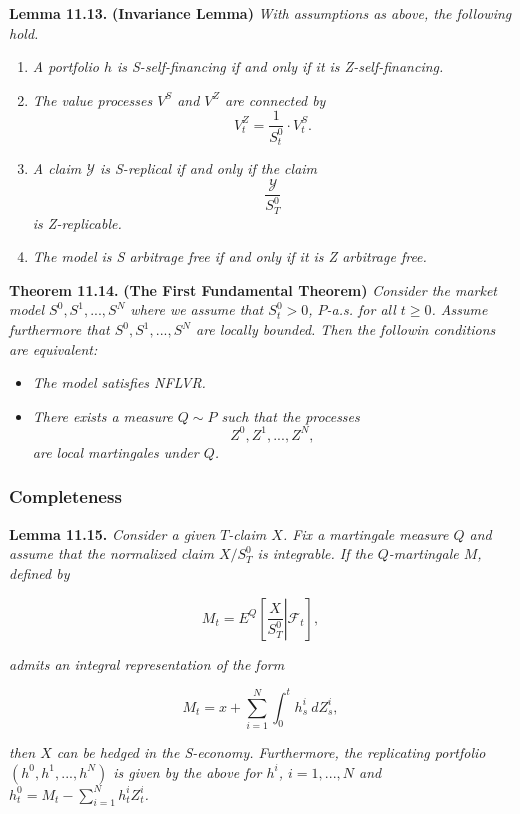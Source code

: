 \documentclass[
]{article}
\providecommand{\tightlist}{%
  \setlength{\itemsep}{0pt}\setlength{\parskip}{0pt}}
\begin{document}
\textbf{Lemma 11.13.} \textbf{(Invariance Lemma)} \emph{With assumptions
as above, the following hold.}

\begin{enumerate}
\def\labelenumi{\roman{enumi}.}
\tightlist
\item
  \emph{A portfolio \(h\) is S-self-financing if and only if it is
  Z-self-financing.}
\item
  \emph{The value processes \(V^S\) and \(V^Z\) are connected by} \[
    V_t^Z=\frac{1}{S_t^0}\cdot V_t^S.
    \]
\item
  \emph{A claim \(\mathcal{Y}\) is S-replical if and only if the claim}
  \[
    \frac{\mathcal{Y}}{S_T^0}
    \] \emph{is Z-replicable.}
\item
  \emph{The model is S arbitrage free if and only if it is Z arbitrage
  free.}
\end{enumerate}

\textbf{Theorem 11.14.} \textbf{(The First Fundamental Theorem)}
\emph{Consider the market model \(S^0,S^1,...,S^N\) where we assume that
\(S^0_t>0\), \(P\)-a.s. for all \(t\ge 0\). Assume furthermore that
\(S^0,S^1,...,S^N\) are locally bounded. Then the followin conditions
are equivalent:}

\begin{itemize}
\tightlist
\item
  \emph{The model satisfies NFLVR.}
\item
  \emph{There exists a measure \(Q\sim P\) such that the processes} \[
    Z^0,Z^1,...,Z^N,
    \] \emph{are local martingales under \(Q\).}
\end{itemize}

\hypertarget{completeness-1}{%
\subsubsection{Completeness}\label{completeness-1}}

\textbf{Lemma 11.15.} \emph{Consider a given \(T\)-claim \(X\). Fix a
martingale measure \(Q\) and assume that the normalized claim
\(X/S^0_T\) is integrable. If the \(Q\)-martingale \(M\), defined by}

\[
M_t=E^Q\left[\left. \frac{X}{S^0_T}\right\vert \mathcal{F}_t\right],\tag{11.34}
\]

\emph{admits an integral representation of the form}

\[
M_t=x+\sum_{i=1}^N\int_0^th_s^i\ dZ_s^i,\tag{11.35}
\]

\emph{then \(X\) can be hedged in the S-economy. Furthermore, the
replicating portfolio \((h^0,h^1,...,h^N)\) is given by the above for
\(h^i\), \(i=1,...,N\) and \(h_t^0=M_t-\sum_{i=1}^Nh_t^iZ_t^i\).}
\end{document}
